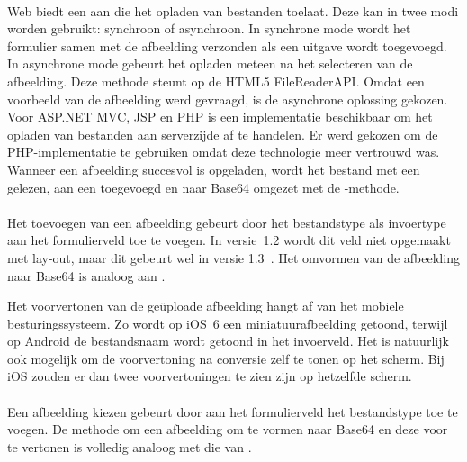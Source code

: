 \paragraph{\kendo}
\kendo{} Web biedt een  aan die het opladen van bestanden toelaat.
Deze  kan in twee modi worden gebruikt: synchroon of asynchroon.
In synchrone mode wordt het formulier samen met de afbeelding verzonden als een uitgave wordt toegevoegd.
In asynchrone mode gebeurt het opladen meteen na het selecteren van de afbeelding.
Deze methode steunt op de HTML5 FileReaderAPI.
Omdat een voorbeeld van de afbeelding werd gevraagd, is de asynchrone oplossing gekozen.	
Voor ASP.NET MVC,  JSP en PHP is een implementatie beschikbaar om het opladen van bestanden aan serverzijde af te handelen.
Er werd gekozen om de PHP-implementatie te gebruiken omdat deze technologie meer vertrouwd was.
Wanneer een afbeelding succesvol is opgeladen, wordt het bestand met een  gelezen,  aan een  toegevoegd en naar Base64 omgezet met de -methode.

\paragraph{\jqm}
Het toevoegen van een afbeelding gebeurt door het bestandstype als invoertype aan het formulierveld toe te voegen. 
In versie~1.2 wordt dit veld niet opgemaakt met lay-out, maar dit gebeurt wel in versie 1.3~\cite{JQuery2013d}. 
Het omvormen van de afbeelding naar Base64 is analoog aan \kendo{}.

Het voorvertonen van de geüploade afbeelding hangt af van het mobiele besturingssysteem.
Zo wordt op iOS~6 een miniatuurafbeelding getoond, terwijl op Android de bestandsnaam wordt getoond in het invoerveld.
Het is natuurlijk ook mogelijk om de voorvertoning na conversie zelf te tonen op het scherm.
Bij iOS zouden er dan twee voorvertoningen te zien zijn op hetzelfde scherm.

\paragraph{\lungo}
Een afbeelding kiezen gebeurt door aan het formulierveld het bestandstype toe te voegen.
De methode om een afbeelding om te vormen naar Base64 en deze voor te vertonen is volledig analoog met die van \jqm{}.


\subsection{}
\label{sec:evaluatie-gebruik-validatie}

